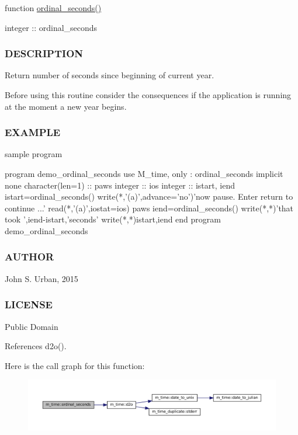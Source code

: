 function \mbox{\hyperlink{namespacem__time_ab8960d2aa60e134bcf77247d8b257963}{ordinal\+\_\+seconds()}}

integer \+:\+: ordinal\+\_\+seconds \subsubsection*{D\+E\+S\+C\+R\+I\+P\+T\+I\+ON}

Return number of seconds since beginning of current year.

Before using this routine consider the consequences if the application is running at the moment a new year begins.

\subsubsection*{E\+X\+A\+M\+P\+LE}

\begin{DoxyVerb}sample program

 program demo_ordinal_seconds
 use M_time, only : ordinal_seconds
 implicit none
 character(len=1) :: paws
 integer          :: ios
 integer          :: istart, iend
 istart=ordinal_seconds()
 write(*,'(a)',advance='no')'now pause. Enter return to continue ...'
 read(*,'(a)',iostat=ios) paws
 iend=ordinal_seconds()
 write(*,*)'that took ',iend-istart,'seconds'
 write(*,*)istart,iend
 end program demo_ordinal_seconds
\end{DoxyVerb}
 \subsubsection*{A\+U\+T\+H\+OR}

John S. Urban, 2015 \subsubsection*{L\+I\+C\+E\+N\+SE}

Public Domain 

References d2o().

Here is the call graph for this function\+:\nopagebreak
\begin{figure}[H]
\begin{center}
\leavevmode
\includegraphics[width=350pt]{namespacem__time_ab8960d2aa60e134bcf77247d8b257963_cgraph}
\end{center}
\end{figure}
\mbox{\label{namespacem__time_aa4dca4409bf20a011bb04988c1335d63}} 
